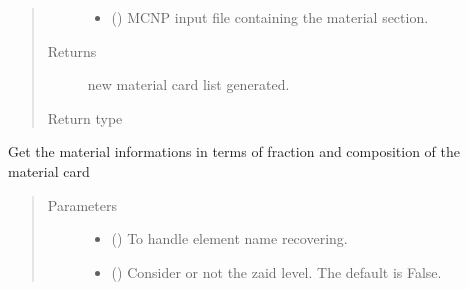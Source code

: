 \documentclass[letterpaper,10pt,english]{sphinxmanual}
\begin{document}
\begin{fulllineitems}
\begin{fulllineitems}
\begin{quote}
\begin{description}
\begin{itemize}
\item {} 
\sphinxAtStartPar
{} () \textendash{} MCNP input file containing the material section.

\end{itemize}

\item[{Returns}] \leavevmode
\sphinxAtStartPar
new material card list generated.

\item[{Return type}] \leavevmode
\sphinxAtStartPar
{\hyperref[\detokenize{api/inputgeneration:matreader.MatCardsList}]{}}

\end{description}\end{quote}

\end{fulllineitems}


\begin{fulllineitems}
\label{\detokenize{api/inputgeneration:matreader.MatCardsList.get_info}}
\sphinxAtStartPar
Get the material informations in terms of fraction and composition
of the material card
\begin{quote}\begin{description}
\item[{Parameters}] \leavevmode\begin{itemize}
\item {} 
\sphinxAtStartPar
{} ({\hyperref[\detokenize{api/initobjects:libmanager.LibManager}]{}}) \textendash{} To handle element name recovering.

\item {} 
\sphinxAtStartPar
{} (\sphinxstyleliteralemphasis{\sphinxupquote{, }}) \textendash{} Consider or not the zaid level. The default is False.


\end{itemize}
\end{description}
\end{quote}
\end{fulllineitems}
\end{fulllineitems}
\end{document}
